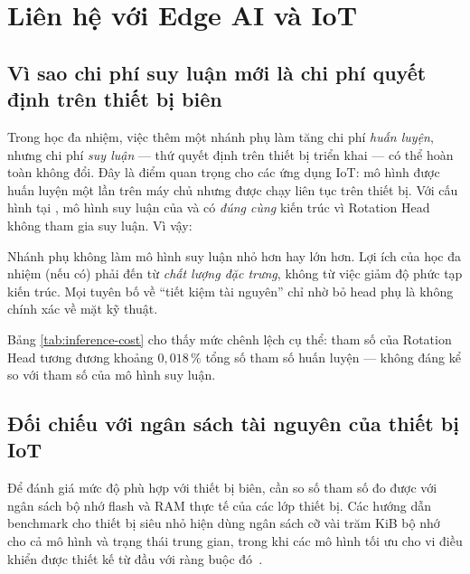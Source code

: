\section{Liên hệ với Edge AI và IoT}
\label{sec:iot}

\subsection{Vì sao chi phí suy luận mới là chi phí quyết định trên thiết bị biên}
\label{sec:iot-why}

Trong học đa nhiệm, việc thêm một nhánh phụ làm tăng chi phí \emph{huấn luyện}, nhưng chi phí
\emph{suy luận} — thứ quyết định trên thiết bị triển khai — có thể hoàn toàn không đổi. Đây là
điểm quan trọng cho các ứng dụng IoT: mô hình được huấn luyện một lần trên máy chủ nhưng được
chạy liên tục trên thiết bị. Với cấu hình tại , mô hình suy luận của 
và  có \emph{đúng cùng} kiến trúc vì Rotation Head không tham gia suy luận. Vì vậy:

\begin{keybox}
Nhánh phụ không làm mô hình suy luận nhỏ hơn hay lớn hơn. Lợi ích của học đa nhiệm (nếu có)
phải đến từ \emph{chất lượng đặc trưng}, không từ việc giảm độ phức tạp kiến trúc. Mọi tuyên bố
về \enquote{tiết kiệm tài nguyên} chỉ nhờ bỏ head phụ là không chính xác về mặt kỹ thuật.
\end{keybox}

Bảng \ref{tab:inference-cost} cho thấy mức chênh lệch cụ thể: \RParamRotationHead{} tham số của
Rotation Head tương đương khoảng $0{,}018\,\%$ tổng số tham số huấn luyện — không đáng kể so
với \RParamInference{} tham số của mô hình suy luận.

\subsection{Đối chiếu với ngân sách tài nguyên của thiết bị IoT}
\label{sec:iot-budget}

Để đánh giá mức độ phù hợp với thiết bị biên, cần so số tham số đo được với ngân sách bộ nhớ
flash và RAM thực tế của các lớp thiết bị. Các hướng dẫn benchmark cho thiết bị siêu nhỏ hiện
dùng ngân sách cỡ vài trăm KiB bộ nhớ cho cả mô hình và trạng thái trung gian, trong khi các mô
hình tối ưu cho vi điều khiển được thiết kế từ đầu với ràng buộc đó~\cite{banbury2021mlperftiny,lin2019mcunet}.

